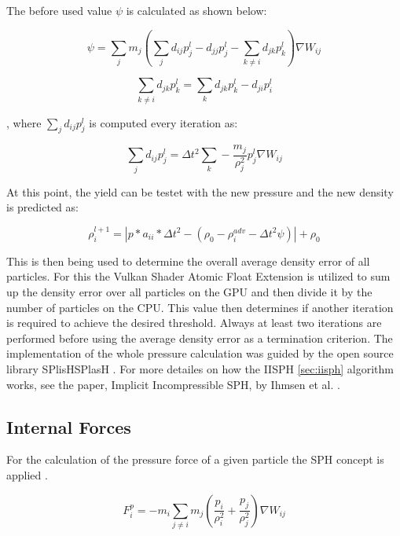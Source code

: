 \documentclass[intern]{cgMA}
\begin{document}
    The before used value $\psi$ is calculated as shown below:

    \begin{equation}
        \psi = \sum_j m_j (\sum_j d_{ij}p_j^l - d_{jj}p_j^l - \sum_{k \neq i} d_{jk}p_k^l) \nabla W_{ij}
    \end{equation}

    \begin{equation}
        \sum_{k \neq i} d_{jk}p_k^l = \sum_{k} d_{jk}p_k^l - d_{ji}p_i^l 
    \end{equation}

    , where $\sum_j d_{ij}p_j^l$ is computed every iteration as:

    \begin{equation}
        \sum_j d_{ij}p_j^l = \Delta t^2 \sum_{k} -\frac{m_j}{\rho_j^2} p_j^l \nabla W_{ij}
    \end{equation}

    At this point, the yield can be testet with the new pressure and the new density is predicted as:

    \begin{equation}
        \rho_i^{l+1} = |p * a_{ii} * \Delta t^2 - (\rho_0 - \rho_i^{adv} - \Delta t^2 \psi)| + \rho_0
    \end{equation}

    This is then being used to determine the overall average density error of all particles. For this the Vulkan Shader Atomic Float Extension is utilized to sum up the density error over all particles on the GPU and then divide it by the number of particles on the CPU. This value then determines if another iteration is required to achieve the desired threshold. Always at least two iterations are performed before using the average density error as a termination criterion. The implementation of the whole pressure calculation was guided by the open source library SPlisHSPlasH \cite{splishsplash}. For more detailes on how the IISPH \ref{sec:iisph} algorithm works, see the paper, Implicit Incompressible SPH, by Ihmsen et al. \cite{6570475}.

    \subsection{Internal Forces}
    
    For the calculation of the pressure force of a given particle the SPH concept is applied \cite{10.2312:PE:vriphys:vriphys12:053-060}. 

    \begin{equation}
        F_i^p = -m_i \sum_{j \neq i} m_j (\frac{p_i}{\rho_i^2} + \frac{p_j}{\rho_j^2})  \nabla W_{ij}
    \end{equation}
    
\end{document}
